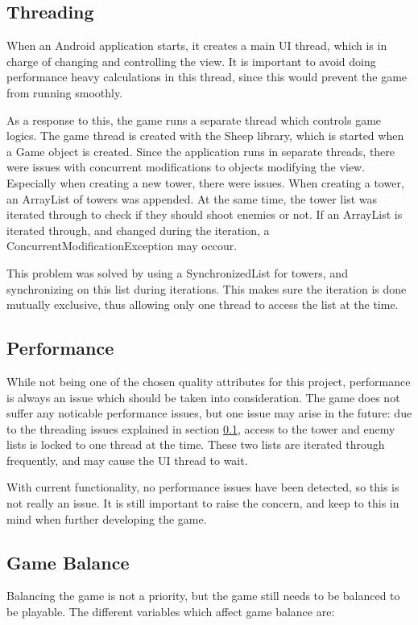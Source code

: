 \subsection{Threading}\label{threading}
When an Android application starts, it creates a main UI thread, which is in charge of changing and controlling the view. It is important to avoid doing performance heavy calculations in this thread, since this would prevent the game from running smoothly.\cite{android:threading} 

As a response to this, the game runs a separate thread which controls game logics. The game thread is created with the Sheep library, which is started when a Game object is created. Since the application runs in separate threads, there were issues with concurrent modifications to objects modifying the view. Especially when creating a new tower, there were issues. When creating a tower, an ArrayList of towers was appended. At the same time, the tower list was iterated through to check if they should shoot enemies or not. 
If an ArrayList is iterated through, and changed during the iteration, a ConcurrentModificationException may occour.\cite{CME} 

This problem was solved by using a SynchronizedList for towers, and synchronizing on this list during iterations. This makes sure the iteration is done mutually exclusive, thus allowing only one thread to access the list at the time.\cite{synclist} 

\subsection{Performance}
While not being one of the chosen quality attributes for this project, performance is always an issue which should be taken into consideration. The game does not suffer any noticable performance issues, but one issue may arise in the future: due to the threading issues explained in section \ref{threading}, access to the tower and enemy lists is locked to one thread at the time. These two lists are iterated through frequently, and may cause the UI thread to wait.

With current functionality, no performance issues have been detected, so this is not really an issue. It is still important to raise the concern, and keep to this in mind when further developing the game.

\subsection{Game Balance}
Balancing the game is not a priority, but the game still needs to be balanced to be playable. The different variables which affect game balance are:


